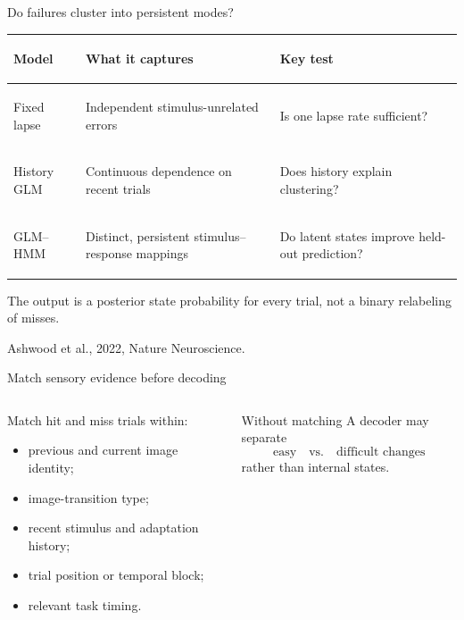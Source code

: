 \documentclass[aspectratio=169,10pt]{beamer}
\newcommand{\sourceNote}[1]{%
  \par\vfill{\fontsize{6}{7}\selectfont\color{NMAMidGray}#1}%
}
\begin{document}
\begin{frame}{Do failures cluster into persistent modes?}
  \begin{tabularx}{\textwidth}{>{\bfseries\raggedright\arraybackslash}p{}Y Y}
    \toprule
    Model & What it captures & Key test \\
    \midrule
    Fixed lapse & Independent stimulus-unrelated errors & Is one lapse rate sufficient? \\
    History GLM & Continuous dependence on recent trials & Does history explain clustering? \\
    GLM--HMM & Distinct, persistent stimulus--response mappings & Do latent states improve held-out prediction? \\
    \bottomrule
  \end{tabularx}

  \vspace{.8em}
  The output is a posterior state probability for every trial, not a binary
  relabeling of misses.

  \sourceNote{Ashwood et al., 2022, Nature Neuroscience.}
\end{frame}

\begin{frame}{Match sensory evidence before decoding}
  \begin{columns}[T,onlytextwidth]
    \begin{column}{.52\textwidth}
      Match hit and miss trials within:
      \begin{itemize}
        \item previous and current image identity;
        \item image-transition type;
        \item recent stimulus and adaptation history;
        \item trial position or temporal block;
        \item relevant task timing.
      \end{itemize}
    \end{column}
    \begin{column}{.42\textwidth}
      \begin{alertblock}{Without matching}
        A decoder may separate
        \[
          \text{easy} \quad \text{vs.} \quad \text{difficult changes}
        \]
        rather than internal states.
      \end{alertblock}
    \end{column}
  \end{columns}

\end{frame}
\end{document}
